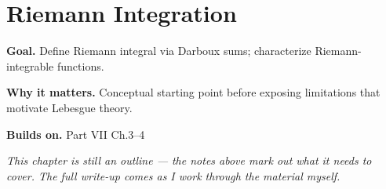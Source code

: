 \chapter{Riemann Integration}
\label{ch:07-real-analysis-and-measure-theory-05}

\begin{chapterintro}
\textbf{Goal.} Define Riemann integral via Darboux sums; characterize Riemann-integrable functions.

\textbf{Why it matters.} Conceptual starting point before exposing limitations that motivate Lebesgue theory.

\textbf{Builds on.} Part VII Ch.3–4
\end{chapterintro}

\textit{This chapter is still an outline --- the notes above mark out what it needs to cover. The full write-up comes as I work through the material myself.}
